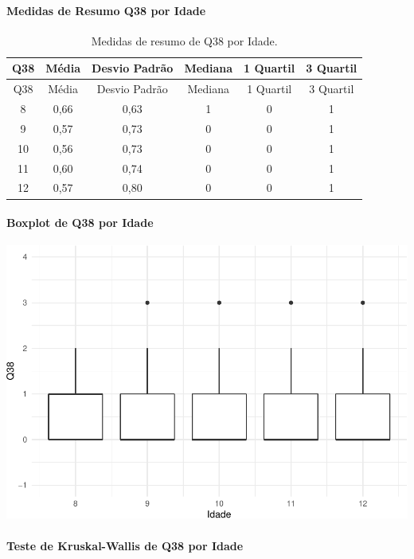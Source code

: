 \documentclass[]{article}
\let\oldparagraph\paragraph
\renewcommand{\paragraph}[1]{\oldparagraph{#1}\mbox{}}
\begin{document}
\cleardoublepage

\hypertarget{medidas-de-resumo-q38-por-idade}{%
\paragraph{Medidas de Resumo Q38 por Idade}\label{medidas-de-resumo-q38-por-idade}}

\begin{longtable}[]{@{}cccccc@{}}
\caption{\label{tab:unnamed-chunk-1452}Medidas de resumo de Q38 por Idade.}\tabularnewline
\toprule
Q38 & Média & Desvio Padrão & Mediana & 1 Quartil & 3 Quartil\tabularnewline
\midrule
\endfirsthead
\toprule
Q38 & Média & Desvio Padrão & Mediana & 1 Quartil & 3 Quartil\tabularnewline
\midrule
\endhead
8 & 0,66 & 0,63 & 1 & 0 & 1\tabularnewline
9 & 0,57 & 0,73 & 0 & 0 & 1\tabularnewline
10 & 0,56 & 0,73 & 0 & 0 & 1\tabularnewline
11 & 0,60 & 0,74 & 0 & 0 & 1\tabularnewline
12 & 0,57 & 0,80 & 0 & 0 & 1\tabularnewline
\bottomrule
\end{longtable}

\hypertarget{boxplot-de-q38-por-idade}{%
\paragraph{Boxplot de Q38 por Idade}\label{boxplot-de-q38-por-idade}}

\begin{center}\includegraphics[width=0.75\linewidth]{relatorio_covid19_files/figure-latex/unnamed-chunk-1453-1} \end{center}

\hypertarget{teste-de-kruskal-wallis-de-q38-por-idade}{%
\paragraph{Teste de Kruskal-Wallis de Q38 por Idade}\label{teste-de-kruskal-wallis-de-q38-por-idade}}
\end{document}
